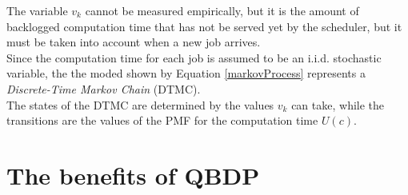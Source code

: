 The variable \( v_{k} \) cannot be measured empirically, but it is the amount of backlogged computation time that has not be served yet by the scheduler, but it must be taken into account when a new job arrives.\\
Since the computation time for each job is assumed to be an i.i.d. stochastic variable, the the moded shown by Equation \ref{markovProcess} represents a \emph{Discrete-Time Markov Chain} (DTMC).\\
The states of the DTMC are determined by the values \( v_{k} \) can take, while the transitions are the values of the PMF for the computation time \( U(c) \).

\section{The benefits of QBDP}